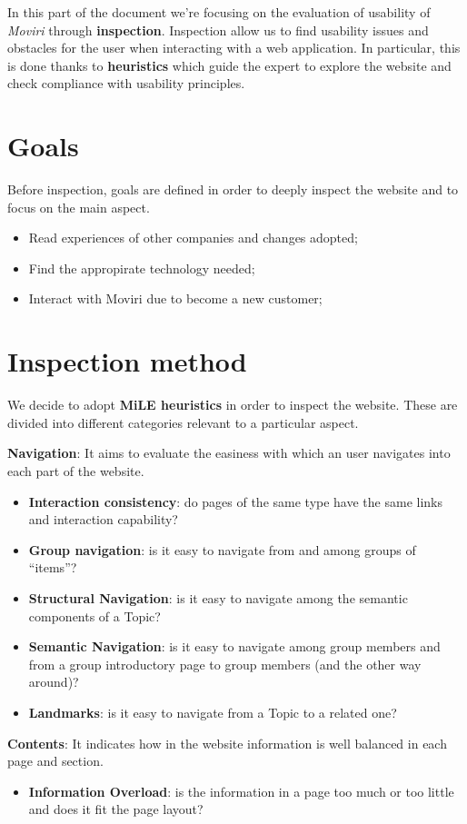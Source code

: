 In this part of the document we're focusing on the evaluation of usability of \textit{Moviri} through \textbf{inspection}. Inspection allow us to find usability issues and obstacles for the user when interacting with a web application. In particular, this is done thanks to \textbf{heuristics} which guide the expert to explore the website and check compliance with usability principles.
\section{Goals}
Before inspection, goals are defined in order to deeply inspect the website and to focus on the main aspect. 
\begin{itemize}
\item Read experiences of other companies and changes adopted;
\item Find the appropirate technology needed;
\item Interact with Moviri due to become a new customer;
\end{itemize}
\section{Inspection method}

We decide to adopt \textbf{MiLE heuristics} in order to inspect the website. These are divided into different categories relevant to a particular aspect.

\textbf{Navigation}: It aims to evaluate the easiness with which an user navigates into each part of the website.
\begin{itemize} 
\item \textbf{Interaction consistency}: do pages of the same type have the same links and interaction capability?
\item \textbf{Group navigation}: is it easy to navigate from and among groups of
“items”?
\item \textbf{Structural Navigation}: is it easy to navigate among the semantic components of a Topic?
\item \textbf{Semantic Navigation}: is it easy to navigate among group members and from a group introductory page to group members (and the other way around)?
\item \textbf{Landmarks}: is it easy to navigate from a Topic to a related one?
\end{itemize}

\textbf{Contents}: It indicates how in the website information is well balanced in each page and section.  
\begin{itemize}
\item \textbf{Information Overload}: is the information in a page too much or too little and does it fit the page layout?
\end{itemize}

